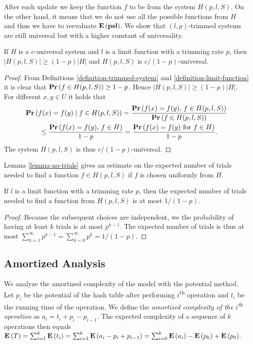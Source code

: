 After each update we keep the function $f$ to be from the system $H(p, l, S)$.
On the other hand, it means that we do not use all the possible functions from $H$ and thus we have to reevaluate $\mathbf{E}\left(\mathbf{psl}\right)$.
We show that $(l, p)$-trimmed systems are still universal but with a higher constant of universality.
\begin{lemma}
\label{lemma-trimmed-system}
If $H$ is a $c$-universal system and $l$ is a limit function with a trimming rate $p$, then $|H(p, l, S)| \geq (1 - p)|H|$ and $H(p, l, S)$ is $c/(1 - p)$-universal.
\end{lemma}
\begin{proof}
From Definitions \ref{definition-trimmed-system} and \ref{definition-limit-function} it is clear that $\mathbf{Pr}\left(f \in H(p, l, S)\right) \geq 1 - p$. Hence $|H(p, l, S)| \geq (1 - p)|H|$.
For different $x, y \in U$ it holds that
\[
\begin{split}
& \mathbf{Pr}\left(f(x) = f(y) \mid f \in H(p, l, S)\right) 
	= \frac{\mathbf{Pr}\left(f(x) = f(y),\, f \in H(p, l, S)\right)}{\mathbf{Pr}\left(f \in H(p, l, S)\right)} \\
	& \qquad \leq \frac{\mathbf{Pr}\left(f(x) = f(y),\, f \in H\right)}{1 - p} = \frac{\mathbf{Pr}\left(f(x) = f(y) \mbox{ for } f \in H\right)}{1 - p}. \\
\end{split}
\]
The system $H(p, l, S)$ is thus $c/(1-p)$-universal.
\end{proof}

Lemma \ref{lemma-no-trials} gives an estimate on the expected number of trials needed to find a function $f \in H(p, l, S)$ if $f$ is chosen uniformly from $H$.
\begin{lemma}
\label{lemma-no-trials}
If $l$ is a limit function with a trimming rate $p$, then the expected number of trials needed to find a function from $H(p, l, S)$ is at most ${1}/{(1 - p)}$.
\end{lemma}
\begin{proof}
Because the subsequent choices are independent, we the probability of having at least $k$ trials is at most $p^{k - 1}$. 
The expected number of trials is thus at most $\sum_{k = 1}^{\infty} p^{k - 1} = \sum_{k = 0}^{\infty} p^k = {1}/{(1 - p)}.$
\end{proof}

\subsection{Amortized Analysis}
We analyze the amortized complexity of the model with the potential method. 
Let $p_i$ be the potential of the hash table after performing $i$\textsuperscript{th} operation and $t_i$ be the running time of the operation. 
We define the \emph{amortized complexity of the $i$\textsuperscript{th} operation} as $a_i = t_i + p_i - p_{i - 1}$. 
The expected complexity of a sequence of $k$ operations then equals $\mathbf{E}\left(T\right) = \sum_{i=1}^{k} \mathbf{E}\left(t_i\right) = \sum_{i = 1}^{k} \mathbf{E}\left(a_i - p_i + p_{i - 1}\right) = \sum_{i=0}^{k} \mathbf{E}\left(a_i\right) - \mathbf{E}\left(p_k\right) + \mathbf{E}\left(p_0\right).$


